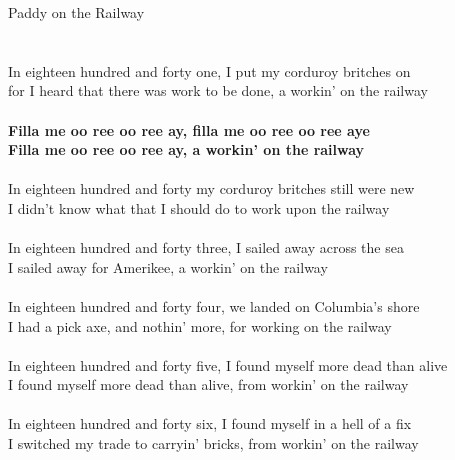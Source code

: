\documentclass[letterpaper,9pt]{article}
\begin{document}
\newpage
{}
\huge
Paddy on the Railway\\
\\
\LARGE
\\In eighteen hundred and forty one, I put my corduroy britches on
\\for I heard that there was work to be done, a workin' on the railway
\\
\\\textbf{Filla me oo ree oo ree ay, filla me oo ree oo ree aye
\\Filla me oo ree oo ree ay, a workin' on the railway}
\\
\\In eighteen hundred and forty my corduroy britches still were new
\\I didn't know what that I should do to work upon the railway
\\
\\In eighteen hundred and forty three, I sailed away across the sea
\\I sailed away for Amerikee, a workin' on the railway
\\
\\In eighteen hundred and forty four, we landed on Columbia's shore
\\I had a pick axe, and nothin' more, for working on the railway
\\
\\In eighteen hundred and forty five, I found myself more dead than alive
\\I found myself more dead than alive, from workin' on the railway
\\
\\In eighteen hundred and forty six, I found myself in a hell of a fix
\\I switched my trade to carryin' bricks, from workin' on the railway
\end{document}
